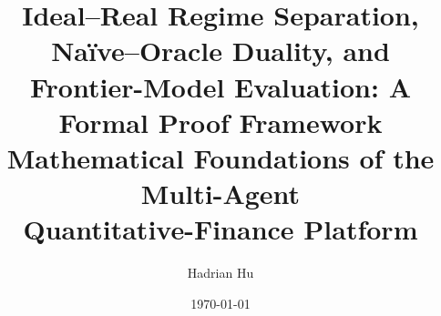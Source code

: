 \documentclass[12pt,openany]{book}
\title{Ideal--Real Regime Separation, Na\"{i}ve--Oracle Duality, and\\
Frontier-Model Evaluation: A Formal Proof Framework\\[0.6em]
{\large Mathematical Foundations of the Multi-Agent\\
Quantitative-Finance Platform}}
\author{Hadrian Hu}
\date{\today}
\numberwithin{equation}{chapter}
\theoremstyle{plain}
\theoremstyle{definition}
\theoremstyle{remark}
\numberwithin{equation}{chapter}
\theoremstyle{plain}
\begin{document}
\maketitle

\label{thm:uncertainty-bounded}
\label{thm:kelly-optimal}
\label{thm:kelly-ruin}
\label{thm:sharpe-bound}
\label{thm:sortino-ge-sharpe}
\label{thm:calmar-bound}
\label{thm:bayes-convergence}
\label{thm:portfolio-opt}
\label{thm:cvar-bound}
\label{thm:assoc}
\label{thm:acyclic-decidable}
\label{thm:idempotent}
\label{thm:leakage-invariant}
\label{thm:type-safe}
\label{thm:hmm-convergence}
\label{thm:uncertainty-decomp}

\tableofcontents
\listoftheorems[ignoreall,show={theorem,lemma,proposition,corollary,definition,axiom,assumption,conjecture}]
\end{document}
